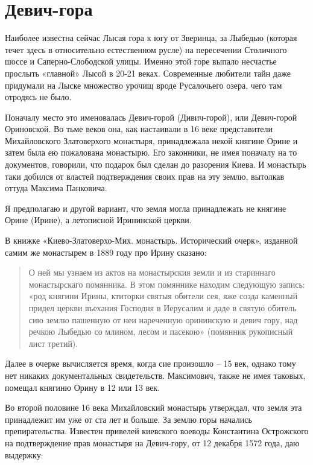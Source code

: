 \chapter{Девич-гора}

Наиболее известна сейчас Лысая гора к югу от Зверинца, за Лыбедью (которая течет здесь в относительно естественном русле) на пересечении Столичного шоссе и Саперно-Слободской улицы. Именно этой горе выпало несчастье прослыть «главной» Лысой в 20-21 веках. Современные любители тайн даже придумали на Лыске множество урочищ вроде Русалочьего озера, чего там отродясь не было.

Поначалу место это именовалась Девич-горой (Див\-ич-горой), или Девич-горой Ориновской. Во тьме веков она, как настаивали в 16 веке представители Михайловского Златоверхого монастыря, принадлежала некой княгине Орине и затем была ею пожалована монастырю. Его законники, не имея поначалу на то документов, говорили, что подарок был сделан до разорения Киева. И монастырь таки добился от властей подтверждения своих прав на эту землю, вытолкав оттуда Максима Панковича.

Я предполагаю и другой вариант, что земля могла принадлежать не княгине Орине (Ирине), а летописной Ирининской церкви.

В книжке «Киево-Златоверхо-Мих. монастырь. Исторический очерк», изданной самим же монастырем в 1889 году про Ирину сказано:

\begin{quotation}
О ней мы узнаем из актов на монастырския земли и из стариннаго монастырскаго помянника. В этом помяннике находим следующую запись: «род княгини Ирины, ктиторки святыя обители сея, яже созда каменный придел церкви въехания Господня в Иерусалим и даде в святую обитель сию землю пашенную от неи нареченную орининскую и девич гору, над речкою Лыбедью со млином, лесом и пасекою» (помянник рукописный лист третий). \end{quotation}

Далее в очерке вычисляется время, когда сие произошло – 15 век, однако тому нет никаких документальных свидетельств. Максимович, также не имея таковых, помещал княгиню Орину в 12 или 13 век.

Во второй половине 16 века Михайловский монастырь утверждал, что земля эта принадлежит им уже от ста лет и больше. За землю горы начались препирательства. Известен привелей киевского воеводы Константина Острожского на подтверждение прав монастыря на Девич-гору, от 12 декабря 1572 года, даю выдержку\cite{mihdocs}:

